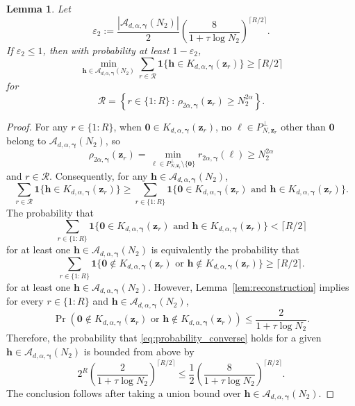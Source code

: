 \documentclass[a4paper,11pt]{article}
\newtheorem{lemma}[theorem]{Lemma}
\newcommand{\bszero}{\boldsymbol{0}}
\newcommand{\bsh}{\boldsymbol{h}}
\newcommand{\bsl}{\boldsymbol{\ell}}
\newcommand{\bsz}{\boldsymbol{z}}
\newcommand{\bsgamma}{\boldsymbol{\gamma}}
\newcommand{\Acal}{\mathcal{A}}
\newcommand{\bsone}{\boldsymbol{1}}
\begin{document}
\begin{lemma}\label{cor:whp2}
    Let 
    \begin{equation}\label{eqn:failprob2}
      \varepsilon_2:=\frac{|\Acal_{d,\alpha,\bsgamma}(N_2)|}{2}\left(\frac{8}{1+\tau\log N_2}\right)^{\lceil R/2 \rceil}.  
    \end{equation}
    If $\varepsilon_2\leq 1$, then with probability at least $1- \varepsilon_2$, 
    \[
      \min_{\bsh\in \Acal_{d,\alpha,\bsgamma}(N_2)} \sum_{r\in \mathcal{R}} \bsone\{\bsh\in K_{d,\alpha,\bsgamma}(\bsz_r)\}\geq \lceil R/2 \rceil
    \]
    for 
    \[
      \mathcal{R}=\left\{r\in \{1{:}R\} \,:\, \rho_{2\alpha, \bsgamma}(\bsz_r)\geq N^{2\alpha}_2 \right\}.
    \]
\end{lemma}
\begin{proof}
For any $r\in \{1{:}R\}$, when $\bszero\in K_{d,\alpha,\bsgamma}(\bsz_r)$, no $\bsl\in P^\perp_{N,\bsz_r}$ other than $\bszero$ belong to $\Acal_{d,\alpha,\bsgamma}(N_2)$, so
$$\rho_{2\alpha, \bsgamma}(\bsz_r)=\min_{\bsl\in P^\perp_{N,\bsz_r}\setminus\{\bszero\}} r_{2\alpha,\bsgamma}(\bsl)\geq N^{2\alpha}_2$$
and $r\in\mathcal{R}$. Consequently, for any $\bsh\in  \Acal_{d,\alpha,\bsgamma}(N_2)$,
\[
  \sum_{r\in \mathcal{R}} \bsone\{\bsh\in K_{d,\alpha,\bsgamma}(\bsz_r)\} \ge 
  \sum_{r\in \{1:R\}} \bsone\{\bszero\in K_{d,\alpha,\bsgamma}(\bsz_r)\text{ and }\bsh\in K_{d,\alpha,\bsgamma}(\bsz_r)\}.
\]
The probability that
\[
\sum_{r\in \{1:R\}} \bsone\{\bszero\in K_{d,\alpha,\bsgamma}(\bsz_r)\text{ and }\bsh\in K_{d,\alpha,\bsgamma}(\bsz_r)\} < \lceil R/2 \rceil 
\]
for at least one $\bsh\in \Acal_{d,\alpha,\bsgamma}(N_2)$ is equivalently the probability that 
\begin{equation}\label{eq:probability_converse}
 \sum_{r\in \{1:R\}} \bsone\{\bszero\notin K_{d,\alpha,\bsgamma}(\bsz_r)\text{ or }\bsh\notin K_{d,\alpha,\bsgamma}(\bsz_r)\} \ge \lceil R/2 \rceil .
\end{equation}
for at least one $\bsh\in \Acal_{d,\alpha,\bsgamma}(N_2)$.
However, Lemma~\ref{lem:reconstruction} implies for every $r\in \{1{:}R\}$ and $\bsh\in  \Acal_{d,\alpha,\bsgamma}(N_2)$,
$$\Pr\left(\bszero\notin K_{d,\alpha,\bsgamma}(\bsz_r)\text{ or } \bsh\notin K_{d,\alpha,\bsgamma}(\bsz_r)\right)\leq \frac{2}{1+\tau\log N_{2}}.$$
Therefore, the probability that \eqref{eq:probability_converse} holds for a given $\bsh\in \Acal_{d,\alpha,\bsgamma}(N_2)$ is bounded from above by 
$$2^R \left(\frac{2}{1+\tau\log N_{2}}\right)^{\lceil R/2 \rceil}\leq \frac{1}{2}\left(\frac{8}{1+\tau\log N_{2}}\right)^{\lceil R/2 \rceil}.$$
The conclusion follows after taking a union bound over $\bsh\in  \Acal_{d,\alpha,\bsgamma}(N_2)$.
\end{proof}
\end{document}
